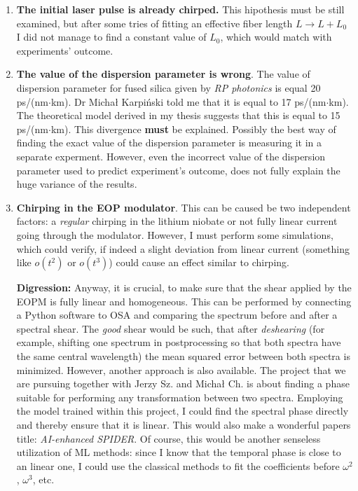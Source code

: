 \documentclass{article}
\begin{document}
\begin{enumerate}
\item \textbf{The initial laser pulse is already chirped.} This hipothesis must be still examined, but after some tries of fitting an effective fiber length $L \to L+L_0$ I did not manage to find a constant value of $L_0$, which would match with experiments' outcome.

\item \textbf{The value of the dispersion parameter is wrong}. The value of dispersion parameter for fused silica given by \emph{RP photonics} is equal 20 ps/(nm$\cdot$km). Dr Michał Karpiński told me that it is equal to 17 ps/(nm$\cdot$km). The theoretical model derived in my thesis suggests that this is equal to 15 ps/(nm$\cdot$km). This divergence \textbf{must} be explained. Possibly the best way of finding the exact value of the dispersion parameter is measuring it in a separate experment. However, even the incorrect value of the dispersion parameter used to predict experiment's outcome, does not fully explain the huge variance of the results.

\item \textbf{Chirping in the EOP modulator}. This can be caused be two independent factors: a \emph{regular} chirping in the lithium niobate or not fully linear current going through the modulator. However, I must perform some simulations, which could verify, if indeed a slight deviation from linear current (something like $o(t^2)$ or $o(t^3)$) could cause an effect similar to chirping. \\

\hspace*{1cm}
\begin{minipage}{.8\textwidth}
\textbf{Digression:} Anyway, it is crucial, to make sure that the shear applied by the EOPM is fully linear and homogeneous. This can be performed by connecting a Python software to OSA and comparing the spectrum before and after a spectral shear. The \emph{good} shear would be such, that after \emph{deshearing} (for example, shifting one spectrum in postprocessing so that both spectra have the same central wavelength) the mean squared error between both spectra is minimized. However, another approach is also available. The project that we are pursuing together with Jerzy Sz. and Michał Ch. is about finding a phase suitable for performing any transformation between two spectra. Employing the model trained within this project, I could find the spectral phase directly and thereby ensure that it is linear. This would also make a wonderful papers title: \emph{AI-enhanced SPIDER}. Of course, this would be another senseless utilization of ML methods: since I know that the temporal phase is close to an linear one, I could use the classical methods to fit the coefficients before $\omega^2$, $\omega^3$, etc.
\end{minipage}


\end{enumerate}
\end{document}

